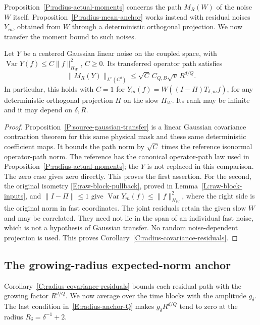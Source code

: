 Proposition~\ref{P:radius-actual-moments} concerns the path $M_R(W)$ of the
noise $W$ itself. Proposition~\ref{P:radius-mean-anchor} works instead with
residual noises $Y_m$, obtained from $W$ through a deterministic orthogonal
projection. We now transfer the moment bound to such noises.

\begin{corollary}
  \label{C:radius-covariance-residuals}
  Let $Y$ be a centered Gaussian linear noise on the coupled space, with
  $\operatorname{Var}Y(f) \le C\|f\|_{H_W}^2$, $C \ge 0$. Its transferred
  operator path satisfies
  \[
    \|M_R(Y)\|_{L^v(C^\theta)}
    \le\sqrt C\,C_{Q,B}\sqrt v\,R^{d/Q}.
  \]
  In particular, this holds with $C = 1$ for $Y_m(f) = W((I-\Pi)T_{\delta,m}f)$,
  for any deterministic orthogonal projection $\Pi$ on the slow $H_W$. Its rank
  may be infinite and it may depend on $\delta,R$.
\end{corollary}

\begin{proof}
  Proposition~\ref{P:source-gaussian-transfer} is a linear Gaussian covariance
  contraction theorem for this same physical mask and these same deterministic
  coefficient maps. It bounds the path norm by $\sqrt C$ times the reference
  isonormal operator-path norm. The reference has the canonical operator-path
  law used in Proposition~\ref{P:radius-actual-moments}; the $Y$ is not replaced
  in this comparison. The zero case gives zero directly. This proves the first
  assertion. For the second, the original isometry \eqref{E:raw-block-pullback},
  proved in Lemma~\ref{L:raw-block-inputs}, and $\|I-\Pi\| \le 1$ give
  $\operatorname{Var}Y_m(f) \le \|f\|_{H_W}^2$, where the right side is the
  original norm in fast coordinates. The joint residuals retain the given slow
  $W$ and may be correlated. They need not lie in the span of an individual fast
  noise, which is not a hypothesis of Gaussian transfer. No random
  noise-dependent projection is used. This proves
  Corollary~\ref{C:radius-covariance-residuals}.
\end{proof}

\subsection{The growing-radius expected-norm anchor}

Corollary~\ref{C:radius-covariance-residuals} bounds each residual path with
the growing factor $R^{d/Q}$. We now average over the time blocks with the
amplitude $g_\delta$. The last condition in~\eqref{E:radius-anchor-Q} makes
$g_\delta R^{d/Q}$ tend to zero at the radius $R_\delta = \delta^{-1}+2$.

